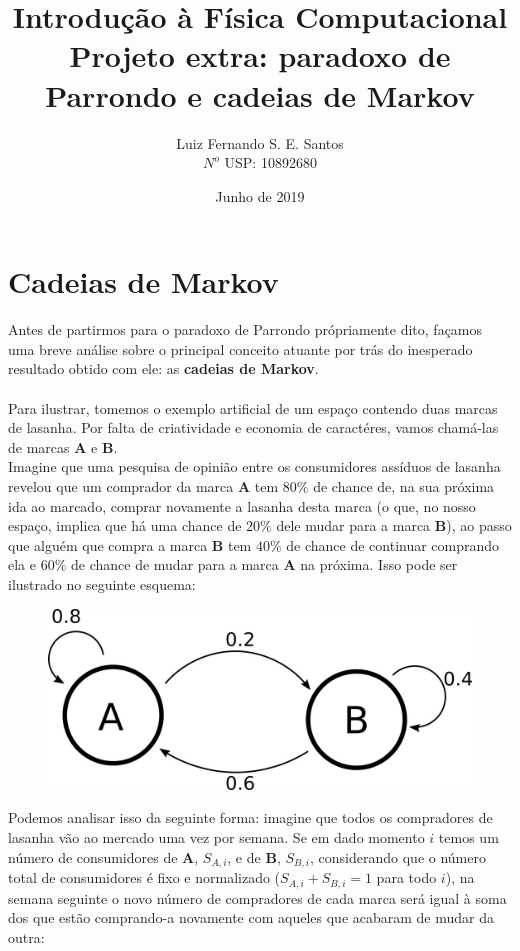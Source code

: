 \documentclass[12pt]{article}
\title{Introdução à Física Computacional\\Projeto extra: paradoxo de Parrondo e cadeias de Markov}
\author{Luiz Fernando S. E. Santos\\$N^o$ USP: 10892680 }
\date{Junho de 2019}
\begin{document}
\maketitle
\pagebreak

\section{Cadeias de Markov}

Antes de partirmos para o paradoxo de Parrondo própriamente dito, façamos uma breve análise sobre o principal conceito atuante por trás do inesperado resultado obtido com ele: as \textbf{cadeias de Markov}.\\
\\
Para ilustrar, tomemos o exemplo artificial de um espaço contendo duas marcas de lasanha. Por falta de criatividade e economia de caractéres, vamos chamá-las de marcas \textbf{A} e \textbf{B}.\\
Imagine que uma pesquisa de opinião entre os consumidores assíduos de lasanha revelou que um comprador da marca \textbf{A} tem $80\%$ de chance de, na sua próxima ida ao marcado, comprar novamente a lasanha desta marca (o que, no nosso espaço, implica que há uma chance de $20\%$ dele mudar para a marca \textbf{B}), ao passo que alguém que compra a marca \textbf{B} tem $40\%$ de chance de continuar comprando ela e $60\%$ de chance de mudar para a marca \textbf{A} na próxima. Isso pode ser ilustrado no seguinte esquema:\\

\begin{figure}[H]
\centering
\includegraphics[scale=0.7]{fig1.png}
\end{figure}

Podemos analisar isso da seguinte forma: imagine que todos os compradores de lasanha vão ao mercado uma vez por semana. Se em dado momento $i$ temos um número de consumidores de \textbf{A}, $S_{A, i}$, e de \textbf{B}, $S_{B, i}$, considerando que o número total de consumidores é fixo e normalizado ($S_{A, i} + S_{B, i} = 1$ para todo $i$), na semana seguinte o novo número de compradores de cada marca será igual à soma dos que estão comprando-a novamente com aqueles que acabaram de mudar da outra:
\end{document}
